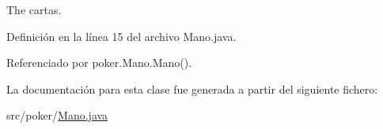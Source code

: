 The cartas. 



Definición en la línea 15 del archivo Mano.\+java.



Referenciado por poker.\+Mano.\+Mano().



La documentación para esta clase fue generada a partir del siguiente fichero\+:\begin{DoxyCompactItemize}
\item 
src/poker/\mbox{\hyperlink{Mano_8java}{Mano.\+java}}\end{DoxyCompactItemize}
